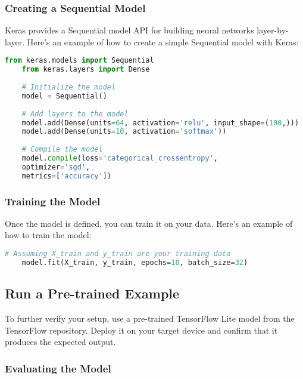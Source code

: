 	\subsubsection{Creating a Sequential Model}
	
	Keras provides a Sequential model API for building neural networks layer-by-layer. Here's an example of how to create a simple Sequential model with Keras:
	
\begin{lstlisting}[language=Python, caption={Example of a neural network model with Keras}, label={code:keras-model-example}, style=pythonstyle]
	from keras.models import Sequential
	from keras.layers import Dense
	
	# Initialize the model
	model = Sequential()
	
	# Add layers to the model
	model.add(Dense(units=64, activation='relu', input_shape=(100,)))
	model.add(Dense(units=10, activation='softmax'))
	
	# Compile the model
	model.compile(loss='categorical_crossentropy',
	optimizer='sgd',
	metrics=['accuracy'])
\end{lstlisting}
	
	\subsubsection{Training the Model}
	
	Once the model is defined, you can train it on your data. Here's an example of how to train the model:
	
\begin{lstlisting}[language=Python, caption={Training the Keras model}, label={code:keras-model-training}, style=pythonstyle]
	# Assuming X_train and y_train are your training data
	model.fit(X_train, y_train, epochs=10, batch_size=32)
\end{lstlisting}
	
	\subsection{Run a Pre-trained Example}
	
	To further verify your setup, use a pre-trained TensorFlow Lite model from the TensorFlow repository. Deploy it on your target device and confirm that it produces the expected output.
	
	
	\subsubsection{Evaluating the Model}
	
